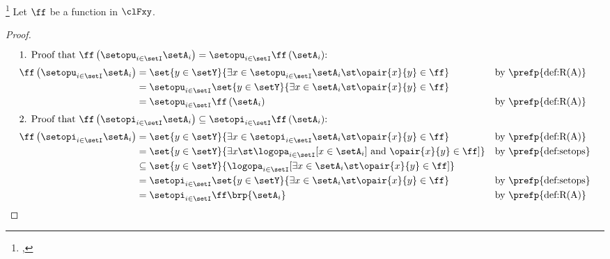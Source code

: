 \begin{theorem}
\footnote{
  ,
  }
\label{thm:f_imgs}
Let $\ff$ be a function in $\clFxy$.
\end{theorem}
\begin{proof}
\begin{align*}
\intertext{1. Proof that $\ff\left(\setopu_{i\in\setI}\setA_i \right) = \setopu_{i\in\setI} \ff\left(\setA_i \right)$:}
  \ff\left(\setopu_{i\in\setI}\setA_i \right)
    &= \set{y\in\setY}{\exists x\in \setopu_{i\in\setI}\setA_i \st \opair{x}{y}\in\ff}
    && \text{by \prefp{def:R(A)}}
  \\&= \setopu_{i\in\setI} \set{y\in\setY}{\exists x\in\setA_i \st \opair{x}{y}\in\ff}
  \\&= \setopu_{i\in\setI} \ff\left(\setA_i \right)
    && \text{by \prefp{def:R(A)}}
\\
\intertext{2. Proof that $\ff\left(\setopi_{i\in\setI}\setA_i \right) \subseteq \setopi_{i\in\setI} \ff\left(\setA_i \right)$:}
  \ff\left(\setopi_{i\in\setI}\setA_i \right)
    &= \set{y\in\setY}{\exists x\in \setopi_{i\in\setI}\setA_i \st \opair{x}{y}\in\ff}
    && \text{by \prefp{def:R(A)}}
  \\&= \set{y\in\setY}{\exists x \st \logopa_{i\in\setI}[x\in\setA_i] \text{ and } \opair{x}{y}\in\ff]}
    && \text{by \prefp{def:setops}}
  \\&\subseteq \set{y\in\setY}{\logopa_{i\in\setI}[\exists x\in\setA_i \st \opair{x}{y}\in\ff]}
  \\&= \setopi_{i\in\setI} \set{y\in\setY}{\exists x\in\setA_i \st \opair{x}{y}\in\ff}
    && \text{by \prefp{def:setops}}
  \\&= \setopi_{i\in\setI} \ff\brp{\setA_i}
    && \text{by \prefp{def:R(A)}}
\end{align*}
\end{proof}

